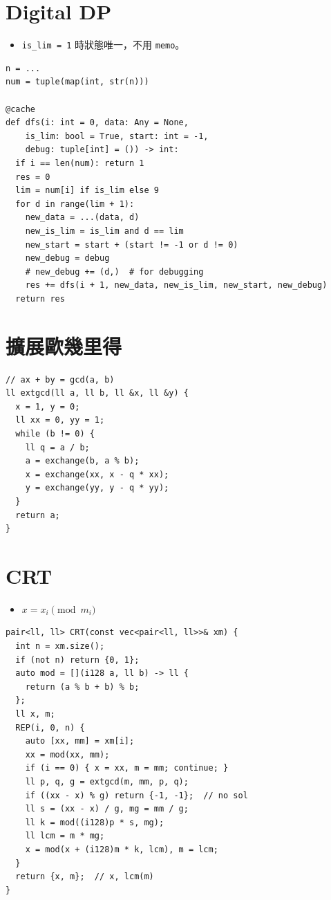 \documentclass[10pt, a4paper, twocolumn]{article}
\begin{document}
\section{Digital DP}

\begin{itemize}[tight_item]
    \item \texttt{is\_lim = 1} 時狀態唯一，不用 \texttt{memo}。
\end{itemize}

\begin{verbatim}
n = ...
num = tuple(map(int, str(n)))

@cache
def dfs(i: int = 0, data: Any = None,
    is_lim: bool = True, start: int = -1,
    debug: tuple[int] = ()) -> int:
  if i == len(num): return 1
  res = 0
  lim = num[i] if is_lim else 9
  for d in range(lim + 1):
    new_data = ...(data, d)
    new_is_lim = is_lim and d == lim
    new_start = start + (start != -1 or d != 0)
    new_debug = debug
    # new_debug += (d,)  # for debugging
    res += dfs(i + 1, new_data, new_is_lim, new_start, new_debug)
  return res
\end{verbatim}

\section{擴展歐幾里得}

\begin{verbatim}
// ax + by = gcd(a, b)
ll extgcd(ll a, ll b, ll &x, ll &y) {
  x = 1, y = 0;
  ll xx = 0, yy = 1;
  while (b != 0) {
    ll q = a / b;
    a = exchange(b, a % b);
    x = exchange(xx, x - q * xx);
    y = exchange(yy, y - q * yy);
  }
  return a;
}
\end{verbatim}

\section{CRT}

\begin{itemize}[tight_item]
  \item $x = x_i \pmod {m_i}$
\end{itemize}

\begin{verbatim}
pair<ll, ll> CRT(const vec<pair<ll, ll>>& xm) {
  int n = xm.size();
  if (not n) return {0, 1};
  auto mod = [](i128 a, ll b) -> ll {
    return (a % b + b) % b;
  };
  ll x, m;
  REP(i, 0, n) {
    auto [xx, mm] = xm[i];
    xx = mod(xx, mm);
    if (i == 0) { x = xx, m = mm; continue; }
    ll p, q, g = extgcd(m, mm, p, q);
    if ((xx - x) % g) return {-1, -1};  // no sol
    ll s = (xx - x) / g, mg = mm / g;
    ll k = mod((i128)p * s, mg);
    ll lcm = m * mg;
    x = mod(x + (i128)m * k, lcm), m = lcm;
  }
  return {x, m};  // x, lcm(m)
}
\end{verbatim}
\end{document}
